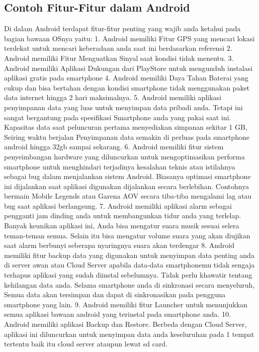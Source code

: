 \begin{figures}
	\subsection{Contoh Fitur-Fitur dalam Android}
		Di dalam Android terdapat fitur-fitur penting yang wajib anda ketahui pada bagian bawaan OSnya yaitu:
		1.	Android memiliki Fitur GPS yang mencari lokasi terdekat untuk mencari keberadaan anda saat ini berdasarkan referensi \cite{anwar2014implementasi}
		2.	Android memiliki Fitur Menguatkan Sinyal saat kondisi tidak menentu.
		3.	Android memiliki Aplikasi Dukungan dari PlayStore untuk mengunduh instalasi aplikasi gratis pada smartphone
		4.	Android memiliki Daya Tahan Baterai yang cukup dan bisa bertahan dengan kondisi smartphone tidak menggunakan paket data internet
			hingga 2 hari maksimalnya.
		5.	Android memiliki aplikasi penyimpanan data yang luas untuk menyimpan data pribadi anda. Tetapi ini sangat bergantung pada spesifikasi
			Smartphone anda yang pakai saat ini. Kapasitas data saat peluncuran pertama menyediakan simpanan sekitar 1 GB, Seiring waktu berjalan
			Penyimpanan data semakin di perluas pada smartphone android hingga 32gb sampai sekarang.
		6. 	Android memiliki fitur sistem penyeimbangan hardware yang diluncurkan untuk mengoptimasikan performa smartphone untuk menghindari terjadinya
			kesalahan teknis atau istilahnya sebagai bug dalam menjalankan sistem Android. Biasanya optimasi smartphone ini dijalankan saat aplikasi digunakan
			dijalankan secara berlebihan. Contohnya bermain Mobile Legends atau Garena AOV secara tiba-tiba mengalami lag atau bug saat aplikasi berlangsung.
		7. 	Android memiliki aplikasi alarm sebagai pengganti jam dinding anda untuk membangunkan tidur anda yang terlelap. Banyak keunikan aplikasi ini,
			Anda bisa mengatur suara musik sesuai selera teman-teman semua. Selain itu bisa mengatur volume suara yang akan diujikan saat alarm berbunyi seberapa nyaringnya suara akan terdengar
		8.	Android memiliki fitur backup data yang digunakan untuk menyimpan data penting anda di server awan atau Cloud Server apabila data-data smartphonemu tidak sengaja terhapus aplikasi yang sudah diinstal sebelumnya.
			Tidak perlu khawatir tentang kehilangan data anda. Selama smartphone anda di sinkronasi secara menyeluruh, Semua data akan tersimpan dan dapat di sinkronasikan pada pengguna smartphone yang lain.
		9.	Android memiliki fitur Launcher untuk menunjukkan semua aplikasi bawaan android yang terinstal pada smartphone anda.
		10.	Android memiliki aplikasi Backup dan Restore. Berbeda dengan Cloud Server, aplikasi ini diluncurkan untuk menyimpan data anda keseluruhan pada 1 tempat tertentu baik itu cloud server ataupun lewat sd card.

\end{figures}
